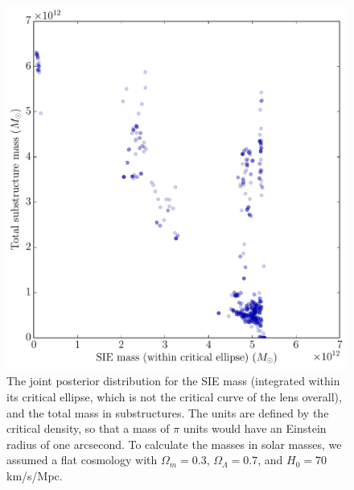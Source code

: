 \documentclass[useAMS,usenatbib]{mn2e}
\begin{document}
\begin{figure}
\begin{center}
\includegraphics[scale=0.4]{masses2.pdf}
\caption{The joint posterior distribution for the SIE mass (integrated within
its critical ellipse, which is not the critical curve of the lens overall),
and the total mass in substructures. The units are defined by the critical
density, so that a mass of $\pi$ units would have an Einstein radius of one arcsecond. To calculate the masses in solar masses, we assumed a flat cosmology with
$\Omega_m=0.3$, $\Omega_\Lambda=0.7$, and
$H_0=70$ km/s/Mpc.
\label{fig:masses2}}
\end{center}
\end{figure}
\end{document}
